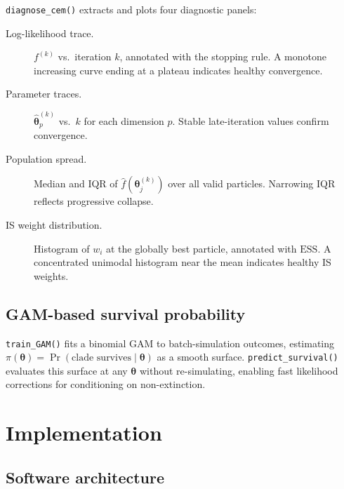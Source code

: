 \documentclass[12pt,a4paper]{article}
\newcommand{\pars}{\bm{\theta}}
\newcommand{\fhat}{\widehat{f}}
\newcommand{\lw}{w}
\newcommand{\ESS}{\mathrm{ESS}}
\begin{document}
\texttt{diagnose\_cem()} extracts and plots four diagnostic panels:
\begin{description}
  \item[Log-likelihood trace.] $f^{(k)}$ vs.\ iteration $k$, annotated
    with the stopping rule. A monotone increasing curve ending at a plateau
    indicates healthy convergence.
  \item[Parameter traces.] $\hat{\pars}^{(k)}_p$ vs.\ $k$ for each
    dimension $p$. Stable late-iteration values confirm convergence.
  \item[Population spread.] Median and IQR of $\fhat(\pars_j^{(k)})$ over
    all valid particles. Narrowing IQR reflects progressive collapse.
  \item[IS weight distribution.] Histogram of $\lw_i$ at the globally
    best particle, annotated with $\ESS$. A concentrated unimodal
    histogram near the mean indicates healthy IS weights.
\end{description}

\subsection{GAM-based survival probability}

\texttt{train\_GAM()} fits a binomial GAM to batch-simulation outcomes,
estimating $\pi(\pars) = \Pr(\text{clade survives}\mid\pars)$ as a smooth
surface. \texttt{predict\_survival()} evaluates this surface at any $\pars$
without re-simulating, enabling fast likelihood corrections for conditioning
on non-extinction.

\section{Implementation}\label{sec:impl}

\subsection{Software architecture}
\end{document}

